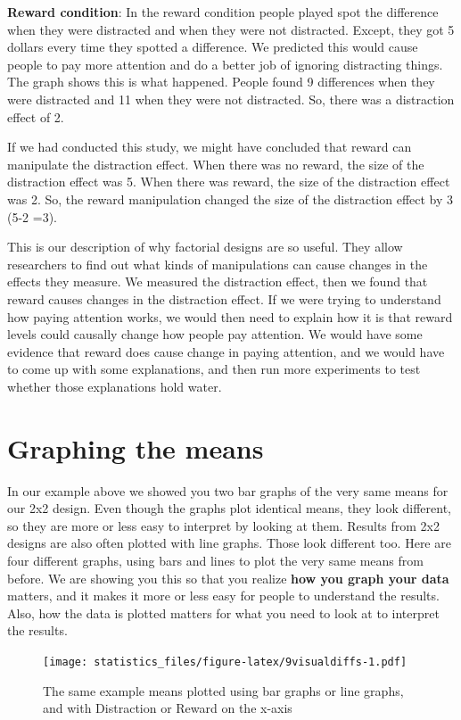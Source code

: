 \documentclass[]{book}
\begin{document}
\textbf{Reward condition}: In the reward condition people played spot the difference when they were distracted and when they were not distracted. Except, they got 5 dollars every time they spotted a difference. We predicted this would cause people to pay more attention and do a better job of ignoring distracting things. The graph shows this is what happened. People found 9 differences when they were distracted and 11 when they were not distracted. So, there was a distraction effect of 2.

If we had conducted this study, we might have concluded that reward can manipulate the distraction effect. When there was no reward, the size of the distraction effect was 5. When there was reward, the size of the distraction effect was 2. So, the reward manipulation changed the size of the distraction effect by 3 (5-2 =3).

This is our description of why factorial designs are so useful. They allow researchers to find out what kinds of manipulations can cause changes in the effects they measure. We measured the distraction effect, then we found that reward causes changes in the distraction effect. If we were trying to understand how paying attention works, we would then need to explain how it is that reward levels could causally change how people pay attention. We would have some evidence that reward does cause change in paying attention, and we would have to come up with some explanations, and then run more experiments to test whether those explanations hold water.

\hypertarget{graphing-the-means}{%
\section{Graphing the means}\label{graphing-the-means}}

In our example above we showed you two bar graphs of the very same means for our 2x2 design. Even though the graphs plot identical means, they look different, so they are more or less easy to interpret by looking at them. Results from 2x2 designs are also often plotted with line graphs. Those look different too. Here are four different graphs, using bars and lines to plot the very same means from before. We are showing you this so that you realize \textbf{how you graph your data} matters, and it makes it more or less easy for people to understand the results. Also, how the data is plotted matters for what you need to look at to interpret the results.

\begin{figure}
\centering
\texttt{[image: statistics\_files/figure-latex/9visualdiffs-1.pdf]}
\caption{\label{fig:9visualdiffs}The same example means plotted using bar graphs or line graphs, and with Distraction or Reward on the x-axis}
\end{figure}
\end{document}
